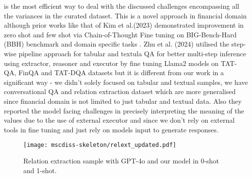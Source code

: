 \documentclass[logo,msc]{infthesis}           %
\begin{document}
is the most efficient way to deal with the discussed challenges encompassing all the variances in the curated dataset. This is a novel approach in financial domain although prior works like that of Kim et al.(2023) demonstrated improvement in zero shot and few shot via Chain-of-Thought Fine tuning on BIG-Bench-Hard (BBH) benchmark and domain specific tasks \cite{kim2023cotcollectionimprovingzeroshot}. Zhu et al. (2024) utilised the step-wise pipeline approach for tabular and textula QA for better multi-step inference using extractor, reasoner and executor by fine tuning Llama2 models on TAT-QA, FinQA and TAT-DQA datasets but it is different from our work in a significant way - we didn't solely focused on tabular and textual samples, we have conversational QA and relation extraction dataset which are more generalised since financial domain is not limited to just tabular and textual data. Also they reported the model facing challenges in precisely interpreting the meaning of the values due to the use of external executor and since we don't rely on external tools in fine tuning and just rely on models input to generate responses. 
\begin{figure}[h]
    \centering
    \texttt{[image: mscdiss-skeleton/relext\_updated.pdf]}
    \caption{Relation extraction sample with GPT-4o and our model in 0-shot and 1-shot.}
    \label{relext}
\end{figure}
\end{document}
